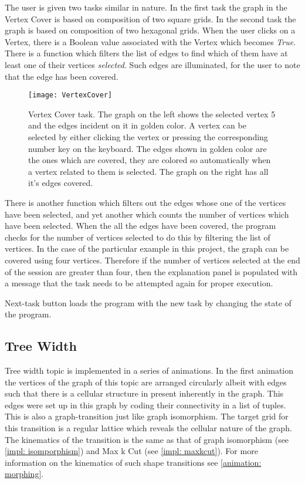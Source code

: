 The user is given two tasks similar in nature. In the first task the graph in
the Vertex Cover is based on composition of two square grids. In the second
task the graph is based on composition of two hexagonal grids.  When the user
clicks on a Vertex, there is a Boolean value associated with the Vertex which
becomes \emph{True}. There is a function which filters the list of edges to
find which of them have at least one of their vertices \emph{selected}. Such
edges are illuminated, for the user to note that the edge has been covered.

\begin{figure}[ht]
\centering
\texttt{[image: VertexCover]}
\caption{
        Vertex Cover task. The graph on the left shows the selected vertex 5
        and the edges incident on it in golden color. A vertex can be selected
        by either clicking the vertex or pressing the corresponding number key
        on the keyboard. The edges shown in golden color are the ones which are
        covered, they are colored so automatically when a vertex related to
        them is selected. The graph on the right has all it's edges covered.
        }
\label{animationfigure: vertexCover}
\end{figure}
There is another function which filters out the edges whose one of the vertices
have been selected, and yet another which counts the number of vertices which
have been selected.  When the all the edges have been covered, the program
checks for the number of vertices selected to do this by filtering the list of
vertices. In the case of the particular example in this project, the graph can
be covered using four vertices. Therefore if the number of vertices selected at
the end of the session are greater than four, then the explanation panel is
populated with a message that the task needs to be attempted again for proper
execution.

Next-task button loads the program with the new task by changing the state of
the program.

\subsection{Tree Width}
Tree width topic is implemented in a series of animations.  In the first
animation the vertices of the graph of this topic are arranged circularly
albeit with edges such that there is a cellular structure in present inherently
in the graph. This edges were set up in this graph by coding their connectivity
in a list of tuples.
This is also a graph-transition just like graph isomorphism. The target grid
for this transition is a regular lattice which reveals the cellular nature of
the graph. The kinematics of the transition is the same as that of graph
isomorphism (see \autoref{impl: isomporphism}) and Max k Cut (see
\autoref{impl: maxkcut}). For more information on the kinematics of such shape
transitions see \autoref{animation: morphing}.

